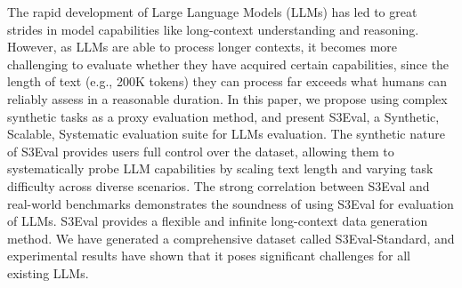 The rapid development of Large Language Models (LLMs) has led to great strides in model capabilities like long-context understanding and reasoning. However, as LLMs are able to process longer contexts, it becomes more challenging to evaluate whether they have acquired certain capabilities, since the length of text (e.g., 200K tokens) they can process far exceeds what humans can reliably assess in a reasonable duration. In this paper, we propose using complex synthetic tasks as a proxy evaluation method, and present S3Eval, a Synthetic, Scalable, Systematic evaluation suite for LLMs evaluation. The synthetic nature of S3Eval provides users full control over the dataset, allowing them to systematically probe LLM capabilities by scaling text length and varying task difficulty across diverse scenarios. The strong correlation between S3Eval and real-world benchmarks demonstrates the soundness of using S3Eval for evaluation of LLMs. S3Eval provides a flexible and infinite long-context data generation method. We have generated a comprehensive dataset called S3Eval-Standard, and experimental results have shown that it poses significant challenges for all existing LLMs.